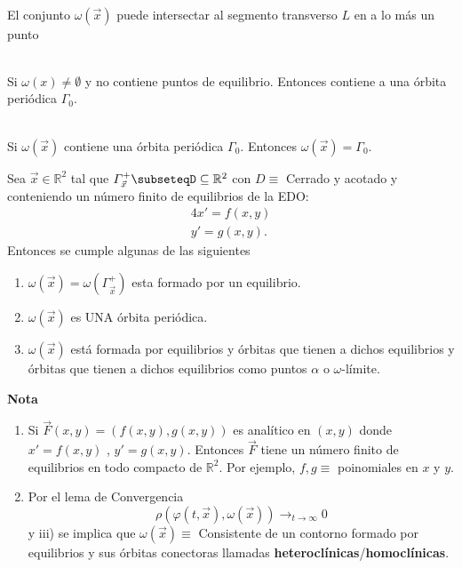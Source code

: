\begin{lemma}\\
	El conjunto $\omega(\vec{x})$ puede intersectar al segmento transverso $L$ en a lo más un punto
\end{lemma}

\begin{lemma}\\
	Si $\omega(x)\neq\emptyset$ y no contiene puntos de equilibrio. Entonces contiene a una órbita periódica $\varGamma_0$.
\end{lemma}

\begin{lemma}\\
	Si $\omega(\vec{x})$ contiene una órbita periódica $\varGamma_0$. Entonces $\omega(\vec{x})=\varGamma_0$.
\end{lemma}

\begin{theorem}
	Sea $\vec{x}\in\mathbb{R}^2$ tal que $\varGamma_{\vec{x}}^+\subseteqD\subseteq\mathbb{R}^2$ con $D\equiv$ Cerrado y
	acotado y conteniendo un número finito de equilibrios de la EDO:\\
	\begin{eqnarray}4
		x'=f(x,y) \\
		y'=g(x,y).
	\end{eqnarray}
	Entonces se cumple algunas de las siguientes
	\begin{enumerate}
		\item $\omega(\vec{x})=\omega(\varGamma_{\vec{x}}^+)$ esta formado por un equilibrio.
		\item $\omega(\vec{x})$ es UNA órbita periódica.
		\item $\omega(\vec{x})$ está formada por equilibrios y órbitas que tienen a dichos equilibrios
		      y órbitas que tienen a dichos equilibrios como puntos $\alpha$ o $\omega$-límite.
	\end{enumerate}
\end{theorem}

\textbf{Nota}\\
\begin{enumerate}
	\item Si $\vec{F}(x,y)=(f(x,y),g(x,y))$ es analítico en $(x,y)$ donde $x'=f(x,y)$ , $y'=g(x,y)$.
	      Entonces $\vec{F}$ tiene un número finito de equilibrios en todo compacto de $\mathbb{R}^2$.
	      Por ejemplo, $f,g\equiv$ poinomiales en $x$ y $y$.
	\item Por el lema de Convergencia
	      $$\rho(\varphi(t,\vec{x}),\omega(\vec{x}))\to_{t\to\infty}0$$
	      y iii) se implica que $\omega(\vec{x})\equiv$ Consistente de un contorno formado por equilibrios y sus órbitas conectoras llamadas
	      \textbf{heteroclínicas}/\textbf{homoclínicas}.
\end{enumerate}

